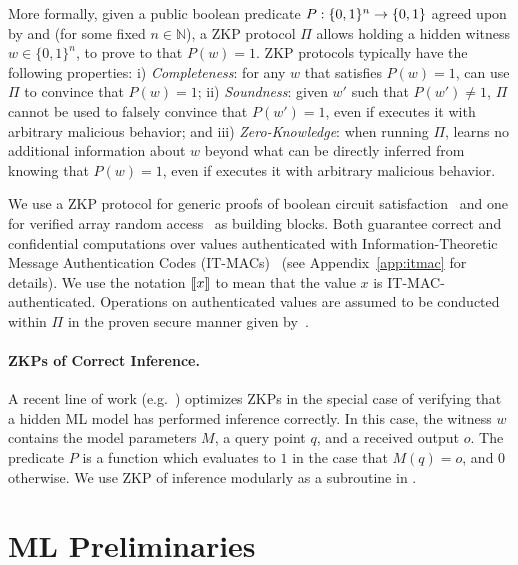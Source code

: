 More formally, given a public boolean predicate $P: \nolinebreak \{0,1\}^n \to \{0,1\}$ agreed upon by \prover and \verifier (for some fixed $n \in \mathbb{N}$), a ZKP protocol $\Pi$ allows \prover holding a hidden witness $w \in \{0,1\}^n$, to prove to \verifier that $P(w)=1$. ZKP protocols typically have the following properties: i) \emph{Completeness}: for any $w$ that satisfies $P(w)=1$, \prover can use $\Pi$ to convince \verifier that $P(w)=1$; ii) \emph{Soundness}: given $w'$ such that $P(w')\neq 1$, $\Pi$ cannot be used to falsely convince \verifier that $P(w')=1$, even if \prover executes it with arbitrary malicious behavior; and iii) \emph{Zero-Knowledge}: when running $\Pi$, \verifier learns no additional information about $w$ beyond what can be directly inferred from knowing that $P(w)=1$, even if \verifier executes it with arbitrary malicious behavior.

We use a ZKP protocol for generic proofs of boolean circuit satisfaction~\cite{weng2021wolverine} and one for verified array random access~\cite{franzese2021zkram} as building blocks. Both guarantee correct and confidential computations over values authenticated with Information-Theoretic Message Authentication Codes (IT-MACs)~\cite{damgaard2012itmac,nielsen2012itmac} (see Appendix~\ref{app:itmac} for details). We use the notation $\llbracket x \rrbracket$ to mean that the value $x$ is IT-MAC-authenticated. Operations on authenticated values are assumed to be conducted within $\Pi$ in the proven secure manner given by~\cite{weng2021wolverine}.

\paragraph{ZKPs of Correct Inference.} A recent line of work (e.g.~\cite{weng2021mystique, lee2024vCNN, sun2024zkllm, hao2024nonlinear}) optimizes ZKPs in the special case of verifying that a hidden ML model has performed inference correctly. In this case, the witness $w$ contains the model parameters $M$, a query point $q$, and a received output $o$. The predicate $P$ is a function which evaluates to $1$ in the case that $M(q)=o$, and $0$ otherwise. We use ZKP of inference modularly as a subroutine in \name.

\section{ML Preliminaries}

